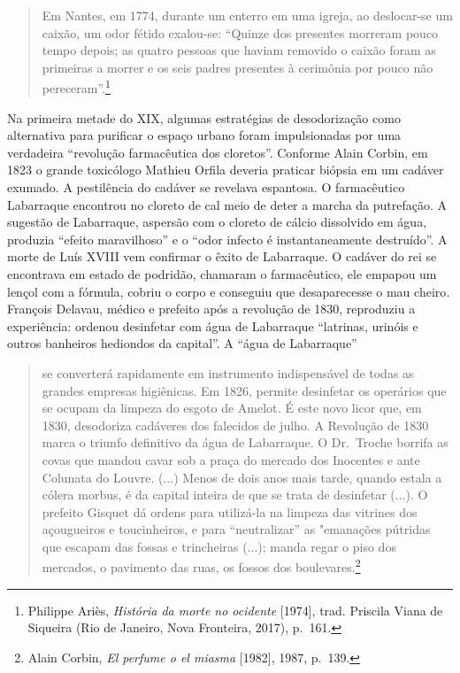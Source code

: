 \begin{quote}
Em Nantes, em 1774, durante um enterro em uma igreja, ao deslocar-se um
caixão, um odor fétido exalou-se: ``Quinze dos presentes morreram pouco
tempo depois; as quatro pessoas que haviam removido o caixão foram as
primeiras a morrer e os seis padres presentes à cerimônia por pouco não
pereceram''.\footnote{Philippe Ariès, \emph{História da morte no
  ocidente} {[}1974{]}, trad. Priscila Viana de Siqueira (Rio de
  Janeiro, Nova Fronteira, 2017), p.~161.}
\end{quote}

Na primeira metade do XIX, algumas estratégias de desodorização como
alternativa para purificar o espaço urbano foram impulsionadas por uma
verdadeira ``revolução farmacêutica dos cloretos''. Conforme Alain
Corbin, em 1823 o grande toxicólogo Mathieu Orfila deveria praticar
biópsia em um cadáver exumado. A pestilência do cadáver se revelava
espantosa. O farmacêutico Labarraque encontrou no cloreto de cal meio de
deter a marcha da putrefação. A sugestão de Labarraque, aspersão com o
cloreto de cálcio dissolvido em água, produzia ``efeito maravilhoso'' e
o ``odor infecto é instantaneamente destruído''. A morte de Luís XVIII
vem confirmar o êxito de Labarraque. O cadáver do rei se encontrava em
estado de podridão, chamaram o farmacêutico, ele empapou um lençol com a
fórmula, cobriu o corpo e conseguiu que desaparecesse o mau
cheiro\emph{.} François Delavau, médico e prefeito após a revolução de
1830, reproduziu a experiência: ordenou desinfetar com água de
Labarraque ``latrinas, urinóis e outros banheiros hediondos da
capital''. A ``água de Labarraque''

\begin{quote}
se converterá rapidamente em instrumento indispensável de todas as
grandes empresas higiênicas. Em 1826, permite desinfetar os operários
que se ocupam da limpeza do esgoto de Amelot\emph{.} É este novo licor
que, em 1830, desodoriza cadáveres dos falecidos de julho. A Revolução
de 1830 marca o triunfo definitivo da água de Labarraque. O Dr.~Troche
borrifa as covas que mandou cavar sob a praça do mercado dos Inocentes e
ante Colunata do Louvre. (...) Menos de dois anos mais tarde, quando
estala a cólera morbus, é da capital inteira de que se trata de
desinfetar (...). O prefeito Gisquet dá ordens para utilizá-la na
limpeza das vitrines dos açougueiros e toucinheiros, e para
``neutralizar'' as "emanações pútridas que escapam das fossas e
trincheiras (...); manda regar o piso dos mercados, o pavimento das
ruas, os fossos dos boulevares.\footnote{Alain Corbin, \emph{El perfume
  o el miasma} {[}1982{]}, 1987, p.~139.}
\end{quote}

